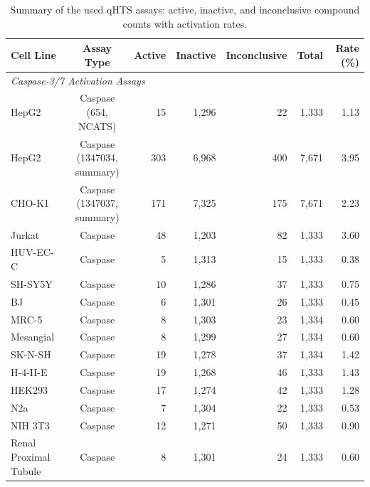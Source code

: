 \documentclass[letterpaper]{article}
\begin{document}
\begin{table}[t]
\centering
\small
\caption{Summary of the used qHTS assays: active, inactive, and
inconclusive compound counts with activation rates.}
\label{tab:assay_summary}
\begin{tabular}{lcrrrrr}
\hline
\textbf{Cell Line} & \textbf{Assay Type} &
\textbf{Active} & \textbf{Inactive} & \textbf{Inconclusive} &
\textbf{Total} & \textbf{Rate (\%)} \\
\hline
\multicolumn{7}{l}{\textit{Caspase-3/7 Activation Assays}} \\
\hline
HepG2                 & Caspase (654, NCATS)           &   15  & 1{,}296 &   22  & 1{,}333 &  1.13 \\
HepG2                 & Caspase (1347034, summary)     &  303  & 6{,}968 &  400  & 7{,}671 &  3.95 \\
CHO-K1                & Caspase (1347037, summary)     &  171  & 7{,}325 &  175  & 7{,}671 &  2.23 \\
Jurkat                & Caspase   &   48  & 1{,}203 &   82  & 1{,}333 &  3.60 \\
HUV-EC-C              & Caspase   &    5  & 1{,}313 &   15  & 1{,}333 &  0.38 \\
SH-SY5Y               & Caspase   &   10  & 1{,}286 &   37  & 1{,}333 &  0.75 \\
BJ                    & Caspase   &    6  & 1{,}301 &   26  & 1{,}333 &  0.45 \\
MRC-5                 & Caspase   &    8  & 1{,}303 &   23  & 1{,}334 &  0.60 \\
Mesangial             & Caspase   &    8  & 1{,}299 &   27  & 1{,}334 &  0.60 \\
SK-N-SH               & Caspase   &   19  & 1{,}278 &   37  & 1{,}334 &  1.42 \\
H-4-II-E              & Caspase   &   19  & 1{,}268 &   46  & 1{,}333 &  1.43 \\
HEK293                & Caspase   &   17  & 1{,}274 &   42  & 1{,}333 &  1.28 \\
N2a                   & Caspase   &    7  & 1{,}304 &   22  & 1{,}333 &  0.53 \\
NIH 3T3               & Caspase   &   12  & 1{,}271 &   50  & 1{,}333 &  0.90 \\
Renal Proximal Tubule & Caspase   &    8  & 1{,}301 &   24  & 1{,}333 &  0.60 \\

\end{tabular}
\end{table}
\end{document}
